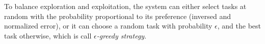 To balance exploration and exploitation, the system can either select tasks at random
with the probability proportional to its preference (inversed and normalized error),
or it can choose a random task with probability $\epsilon$, and the best task otherwise,
which is call \emph{$\epsilon$-greedy strategy}.






